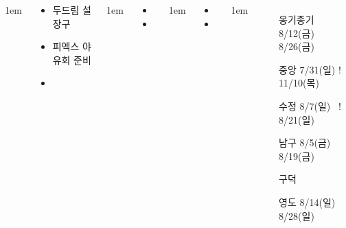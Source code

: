 \documentclass[	20pt, 
							a1paper, 
							portrait, %
							margin=0mm, %
							innermargin=10mm,  		%
							colspace=5mm, 
							subcolspace=0mm
							]{tikzposter}
\begin{document}
\begin{columns}
			{
					\setlength{\leftmargini}{4em}
					\setlength{\labelsep} {1em}
				\begin{LARGE}
					\begin{itemize}
					\item 두드림 설장구
					\item 피엑스 야유회 준비
					\item 
					\end{itemize}
				\end{LARGE}
			}

			{
					\setlength{\leftmargini}{4em}
					\setlength{\labelsep} {1em}
				\begin{LARGE}
					\begin{itemize}
					\item 
					\item 
					\end{itemize}
				\end{LARGE}
			}


			{
					\setlength{\leftmargini}{4em}
					\setlength{\labelsep} {1em}
				\begin{LARGE}
					\begin{itemize}
					\item 
					\item 
					\end{itemize}
				\end{LARGE}
			}





			{
					\setlength{\leftmargini}{6em}
					\setlength{\labelsep} {1em}
					\begin{itemize}
					\item [옹기종기] 8/12(금) ~ 8/26(금)
					\item [중앙] 7/31(일) ! 11/10(목)
					\item [수정] 8/7(일) ~! 8/21(일)
					\item [남구] 8/5(금) ~ 8/19(금)
					\item [구덕] 
					\item [영도] 8/14(일) ~ 8/28(일)


\end{itemize}}
\end{columns}
\end{document}
